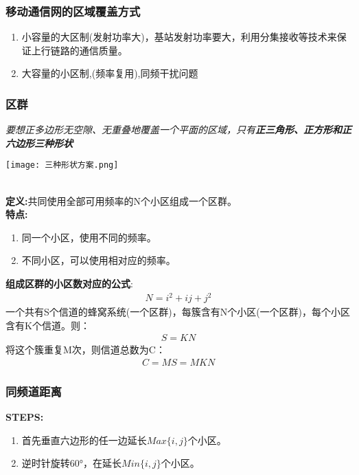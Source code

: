 	\subsubsection{移动通信网的区域覆盖方式}
	\begin{enumerate}
		\item 小容量的大区制(发射功率大)，基站发射功率要大，利用分集接收等技术来保证上行链路的通信质量。
		\item  大容量的小区制,(频率复用),同频干扰问题
	\end{enumerate}
	\subsubsection{区群}
	\begin{minipage}{0.4\linewidth}
	\textit{要想正多边形无空隙、无重叠地覆盖一个平面的区域，只有\textbf{正三角形、正方形和正六边形三种形状}}
	\end{minipage}
	\begin{minipage}{0.4\linewidth}
		\centering
		\texttt{[image: 三种形状方案.png]}
	\end{minipage}\\
	 \textbf{定义:}共同使用全部可用频率的N个小区组成一个区群。\\
	 \textbf{特点:}
	 \begin{enumerate}
	 	\item 同一个小区，使用不同的频率。
	 	\item 不同小区，可以使用相对应的频率。
	 \end{enumerate}
 	\textbf{组成区群的小区数对应的公式}:
 	\begin{eqnarray}
 		N = i^2+ij+j^2
 	\end{eqnarray}
	一个共有S个信道的蜂窝系统(一个区群)，每簇含有N个小区(一个区群)，每个小区含有K个信道。则：
	\begin{eqnarray}
		S = KN
	\end{eqnarray}
	将这个簇重复M次，则信道总数为C：
	\begin{eqnarray}
	C = MS = MKN
	\end{eqnarray}
	\subsubsection{同频道距离}
	\textbf{STEPS:}
	\begin{enumerate}
		\item 首先垂直六边形的任一边延长$Max\{i,j\}$个小区。
		\item 逆时针旋转60°，在延长$Min\{i,j\}$个小区。
	\end{enumerate}

